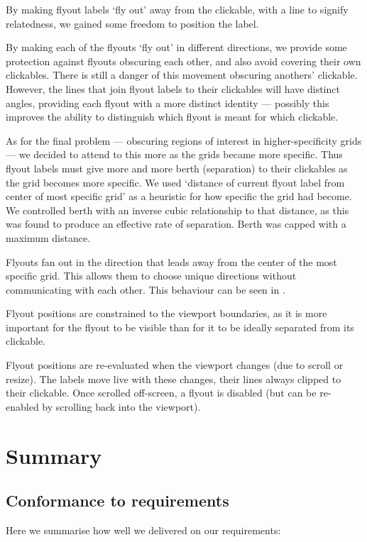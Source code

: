 \documentclass[11pt,openright,a4paper]{report}
\begin{document}
By making flyout labels `fly out' away from the clickable, with a line to signify relatedness, we gained some freedom to position the label.

By making each of the flyouts `fly out' in different directions, we provide some protection against flyouts obscuring each other, and also avoid covering their own clickables. There is still a danger of this movement obscuring anothers' clickable. However, the lines that join flyout labels to their clickables will have distinct angles, providing each flyout with a more distinct identity --- possibly this improves the ability to distinguish which flyout is meant for which clickable.

As for the final problem --- obscuring regions of interest in higher-specificity grids --- we decided to attend to this more as the grids became more specific. Thus flyout labels must give more and more berth (separation) to their clickables as the grid becomes more specific. We used `distance of current flyout label from center of most specific grid' as a heuristic for how specific the grid had become. We controlled berth with an inverse cubic relationship to that distance, as this was found to produce an effective rate of separation. Berth was capped with a maximum distance.

Flyouts fan out in the direction that leads away from the center of the most specific grid. This allows them to choose unique directions without communicating with each other. This behaviour can be seen in .

Flyout positions are constrained to the viewport boundaries, as it is more important for the flyout to be visible than for it to be ideally separated from its clickable.

Flyout positions are re-evaluated when the viewport changes (due to scroll or resize). The labels move live with these changes, their lines always clipped to their clickable. Once scrolled off-screen, a flyout is disabled (but can be re-enabled by scrolling back into the viewport).

\section{Summary}
\subsection{Conformance to requirements}
Here we summarise how well we delivered on our requirements:
\end{document}
